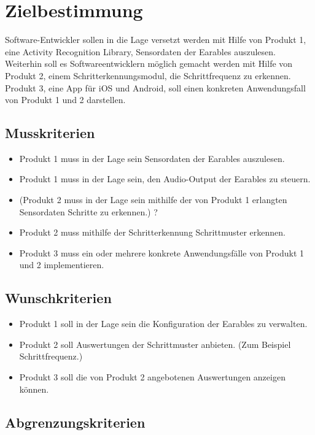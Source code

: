 
	\chapter{Zielbestimmung}
		Software-Entwickler sollen in die Lage versetzt werden mit Hilfe von Produkt 1, eine Activity Recognition Library, Sensordaten der Earables auszulesen. 
		Weiterhin soll es Softwareentwicklern möglich gemacht werden mit Hilfe von Produkt 2, einem Schritterkennungsmodul, die Schrittfrequenz zu erkennen.
		Produkt 3, eine App für iOS und Android, soll einen konkreten Anwendungsfall von Produkt 1 und 2 darstellen.
		\section{Musskriterien}
		\begin{itemize}
			\item Produkt 1 muss in der Lage sein Sensordaten der Earables auszulesen.
			\item Produkt 1 muss in der Lage sein, den Audio-Output der Earables zu steuern.
			\item (Produkt 2 muss in der Lage sein mithilfe der von Produkt 1 erlangten Sensordaten Schritte zu erkennen.) ?
			\item Produkt 2 muss mithilfe der Schritterkennung Schrittmuster erkennen.
			\item Produkt 3 muss ein oder mehrere konkrete Anwendungsfälle von Produkt 1 und 2 implementieren.
		\end{itemize}
		\section{Wunschkriterien}
		\begin{itemize}
			\item Produkt 1 soll in der Lage sein die Konfiguration der Earables zu verwalten.
			\item Produkt 2 soll Auswertungen der Schrittmuster anbieten. (Zum Beispiel Schrittfrequenz.)
			\item Produkt 3 soll die von Produkt 2 angebotenen Auswertungen anzeigen können.
		\end{itemize}
		\section{Abgrenzungskriterien}
